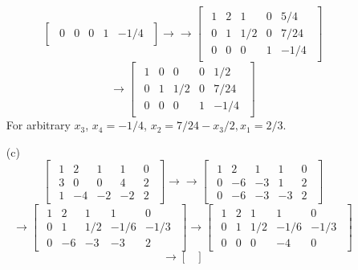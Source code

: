 \begin{description}
\begin{itemize}
$$\begin{bmatrix}
\begin{array}{cccc|c}
0 & 0 & 0 & 1 & -1/4
\end{array}
\end{bmatrix}\rightarrow\rightarrow \begin{bmatrix}
\begin{array}{cccc|c}
1 & 2 & 1 & 0 & 5/4 \\
0 & 1 & 1/2 & 0 & 7/24 \\
0 & 0 & 0 & 1 & -1/4
\end{array}
\end{bmatrix}$$
$$\rightarrow \begin{bmatrix}
\begin{array}{cccc|c}
1 & 0 & 0 & 0 & 1/2 \\
0 & 1 & 1/2 & 0 & 7/24 \\
0 & 0 & 0 & 1 & -1/4
\end{array}
\end{bmatrix}$$
For arbitrary $x_3$, $x_4 = -1/4$, $x_2 = 7/24 - x_3/2, x_1 = 2/3$.
\item[(c)]
$$\begin{bmatrix}
\begin{array}{cccc|c}
1 & 2 & 1 & 1 & 0 \\
3 & 0 & 0 & 4 & 2 \\
1 & -4 & -2 & -2 & 2
\end{array}
\end{bmatrix} \rightarrow\rightarrow \begin{bmatrix}
\begin{array}{cccc|c}
1 & 2 & 1 & 1 & 0 \\
0 & -6 & -3 & 1 & 2 \\
0 & -6 & -3 & -3 & 2
\end{array}
\end{bmatrix}$$
$$ \rightarrow \begin{bmatrix}
\begin{array}{cccc|c}
1 & 2 & 1 & 1 & 0 \\
0 & 1 & 1/2 & -1/6 & -1/3 \\
0 & -6 & -3 & -3 & 2
\end{array}
\end{bmatrix} \rightarrow \begin{bmatrix}
\begin{array}{cccc|c}
1 & 2 & 1 & 1 & 0 \\
0 & 1 & 1/2 & -1/6 & -1/3 \\
0 & 0 & 0 & -4 & 0
\end{array}
\end{bmatrix}$$
$$\rightarrow \begin{bmatrix}

\end{bmatrix}$$
\end{itemize}
\end{description}
